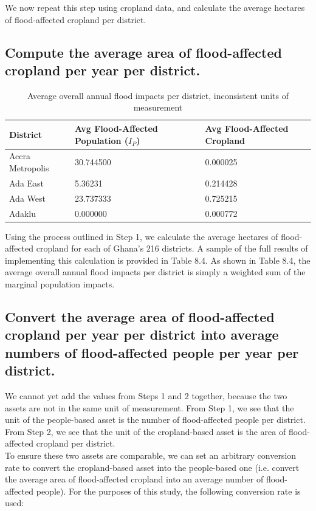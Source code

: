 We now repeat this step using cropland data, and calculate the average hectares of flood-affected cropland per district.

\subsection{Compute the average area of flood-affected cropland per year per district.}

\begin{table}
\centering
\begin{tabular}{|p{3.5cm}|p{4.5cm}|p{4.5cm}|}
\hline
\textbf{District} & \textbf{Avg Flood-Affected Population (\({I_P}\))} & \textbf{Avg Flood-Affected Cropland}\\
\hline
Accra Metropolis\rule{0pt}{4ex} & 30.744500 & 0.000025\\
Ada East\rule{0pt}{4ex} & 5.36231 & 0.214428\\
Ada West\rule{0pt}{4ex} & 23.737333 & 0.725215\\
Adaklu\rule{0pt}{4ex} & 0.000000 & 0.000772\\
\hline
\end{tabular}
\caption{Average overall annual flood impacts per district, inconsistent units of measurement}
\end{table}

Using the process outlined in Step 1, we calculate the average hectares of flood-affected cropland for each of Ghana's 216 districts. A sample of the full results of implementing this calculation is provided in Table 8.4. As shown in Table 8.4, the average overall annual flood impacts per district is simply a weighted sum of the marginal population impacts.

\subsection{Convert the average area of flood-affected cropland per year per district into average numbers of flood-affected people per year per district.}

We cannot yet add the values from Steps 1 and 2 together, because the two assets are not in the same unit of measurement. From Step 1, we see that the unit of the people-based asset is the number of flood-affected people per district. From Step 2, we see that the unit of the cropland-based asset is the area of flood-affected cropland per district.\\

To ensure these two assets are comparable, we can set an arbitrary conversion rate to convert the cropland-based asset into the people-based one (i.e. convert the average area of flood-affected cropland into an average number of flood-affected people). For the purposes of this study, the following conversion rate is used:

